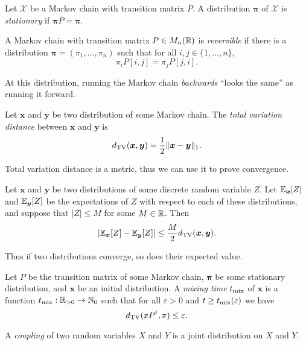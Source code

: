 \begin{definition}
    Let $\mathcal X$ be a Markov chain with transition matrix $P$. A distribution $\bm \pi$ of $\mathcal X$ is \emph{stationary} if $\bm\pi P = \bm\pi$.
\end{definition}

\begin{definition}[Reversibility]
    A Markov chain with transition matrix $P \in M_n(\mathbb R)$ is \emph{reversible} if there is a distribution $\bm\pi = (\pi_1, \ldots, \pi_n)$ such that for all $i,j \in \{1, \ldots, n\}$,
    \[ \pi_i P[i,j] = \pi_j P[j,i]. \]
\end{definition}

At this distribution, running the Markov chain \emph{backwards} ``looks the same'' as running it forward.

\begin{definition}
    Let $\bm x$ and $\bm y$ be two distribution of some Markov chain. The \emph{total variation distance} between $\bm x$ and $\bm y$ is
    \[ d_{\text{TV}}(\bm x, \bm y) = \frac12 \lVert \bm x - \bm y \rVert_1. \]
\end{definition}

Total variation distance is a metric, thus we can use it to prove convergence. 

\begin{lemma}
    Let $\bm x$ and $\bm y$ be two distributions of some discrete random variable $Z$. Let $\mathbb E_{\bm x}[Z]$ and $\mathbb E_{\bm y}[Z]$ be the expectations of $Z$ with respect to each of these distributions, and suppose that $\lvert Z \rvert \leq M$ for some $M \in \mathbb R$. Then
    \[ \left\lvert \mathbb E_{\bm x}[Z] - \mathbb E_{\bm y}[Z] \right\rvert \leq \frac M2 d_{\text{TV}}(\bm x, \bm y). \]
\end{lemma}

Thus if two distributions converge, so does their expected value. 

\begin{definition}
    Let $P$ be the transition matrix of some Markov chain, $\bm\pi$ be some stationary distribution, and $\bm x$ be an initial distribution. A \emph{mixing time} $t_{\text{mix}}$ of $\bm x$ is a function $t_{\text{mix}}: \mathbb R_{> 0} \to \mathbb N_0$ such that for all $\varepsilon > 0$ and $t \geq t_{\text{mix}}(\varepsilon)$ we have
    \[ d_{\text{TV}}(xP^t, \pi) \leq \varepsilon. \]
\end{definition}

\begin{definition}[Coupling]
    A \emph{coupling} of two random variables $X$ and $Y$ is a joint distribution on $X$ and $Y$.
\end{definition}

